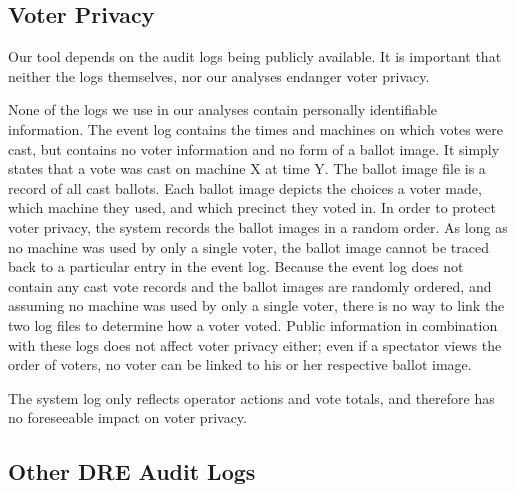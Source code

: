 \documentclass[letterpaper,twocolumn,10pt]{article}
\begin{document}
\subsection{Voter Privacy}
Our tool depends on the audit logs being publicly available. It is important
that neither the logs themselves, nor our analyses endanger voter privacy. 

None of the logs we use in our analyses contain personally identifiable
information. The event log contains the times and machines on which votes  
were cast, but contains no voter information and no form of a ballot image. It
simply  
states that a vote was cast on machine X at time Y. The ballot image file is a 
record of all cast ballots.  Each ballot image 
depicts the choices a voter made, which machine they used, and which precinct they 
voted in. In order to protect voter privacy, the system records the ballot images 
in a random order. As long as no machine was used by only a single voter, the
ballot image cannot be traced back 
to a particular entry in the event log. Because the event log does not 
contain any cast vote records and the ballot images are randomly ordered, and
assuming no machine was used by only a single voter, there is 
no way to link the two log files to determine how a voter voted. Public
information in combination with these logs does not affect voter privacy either;
even if a spectator views the order of voters, no voter can be linked to his or
her respective ballot image.     

The system log only reflects operator actions and vote
totals, and therefore has no foreseeable impact on voter privacy. 

\subsection{Other DRE Audit Logs}
\end{document}
